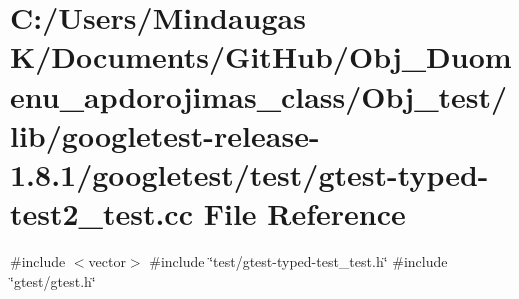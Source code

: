 \hypertarget{_obj__test_2lib_2googletest-release-1_88_81_2googletest_2test_2gtest-typed-test2__test_8cc}{}\section{C\+:/\+Users/\+Mindaugas K/\+Documents/\+Git\+Hub/\+Obj\+\_\+\+Duomenu\+\_\+apdorojimas\+\_\+class/\+Obj\+\_\+test/lib/googletest-\/release-\/1.8.1/googletest/test/gtest-\/typed-\/test2\+\_\+test.cc File Reference}
\label{_obj__test_2lib_2googletest-release-1_88_81_2googletest_2test_2gtest-typed-test2__test_8cc}
{\ttfamily \#include $<$vector$>$}\newline
{\ttfamily \#include \char`\"{}test/gtest-\/typed-\/test\+\_\+test.\+h\char`\"{}}\newline
{\ttfamily \#include \char`\"{}gtest/gtest.\+h\char`\"{}}\newline

